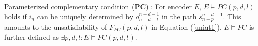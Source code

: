 \documentclass[journal]{IEEEtran}
\begin{document}
%
%
%
%
%

\begin{definition11}\label{def_pcc}%
Parameterized complementary condition ($\boldsymbol{PC}$) :
For encoder $E$,
$E\vDash PC(p,d,l)$ holds if
$i_n$ can be uniquely determined by $o_{n+d-l}^{n+d-1}$ in the path $s_{n-p}^{n+d-1}$.
This amounts to the unsatisfiability of $F_{PC}(p,d,l)$ in Equation (\ref{uniqt1}).
$E\vDash PC$ is further defined as $\exists p,d,l:E\vDash PC(p,d,l)$.
\end{definition11}
\end{document}

